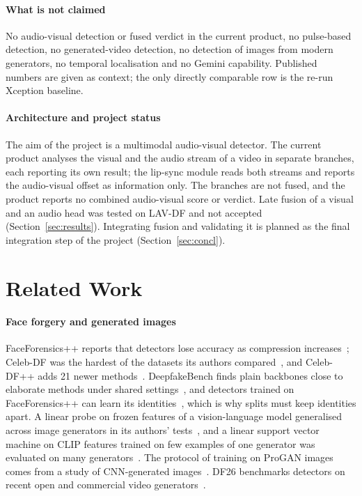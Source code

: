 \documentclass[conference,a4paper]{IEEEtran_nodash}
\begin{document}
\paragraph*{What is not claimed}
No audio-visual detection or fused verdict in the current product, no pulse-based detection, no
generated-video detection, no detection of images from modern generators, no
temporal localisation and no Gemini capability. Published numbers are given as
context; the only directly comparable row is the re-run Xception baseline.

\paragraph*{Architecture and project status}
The aim of the project is a multimodal audio-visual detector. The current product
analyses the visual and the audio stream of a video in separate branches, each
reporting its own result; the lip-sync module reads both streams and reports the
audio-visual offset as information only. The branches are not fused, and the product
reports no combined audio-visual score or verdict. Late fusion of a visual and an
audio head was tested on LAV-DF and not accepted (Section~\ref{sec:results}).
Integrating fusion and validating it is planned as the final integration step of the
project (Section~\ref{sec:concl}). %

\section{Related Work}\label{sec:related}

\paragraph*{Face forgery and generated images}
FaceForensics++ reports that detectors lose accuracy as compression
increases~\cite{rossler2019faceforensics}; Celeb-DF was the hardest of the
datasets its authors compared~\cite{li2020celebdf}, and Celeb-DF++ adds 21 newer
methods~\cite{li2025celebdfpp}. DeepfakeBench finds plain backbones close to
elaborate methods under shared settings~\cite{yan2023deepfakebench}, and detectors
trained on FaceForensics++ can learn its identities~\cite{dong2023implicit}, which
is why splits must keep identities apart. A linear probe on frozen features of a
vision-language model generalised across image generators in its authors'
tests~\cite{ojha2024universal}, and a linear support vector machine on CLIP
features trained on few examples of one generator was evaluated on many
generators~\cite{cozzolino2024raising}. The protocol of training on ProGAN images
comes from a study of CNN-generated images~\cite{wang2020cnnspot}. DF26 benchmarks
detectors on recent open and commercial video generators~\cite{shykula2026df26}.
\end{document}
